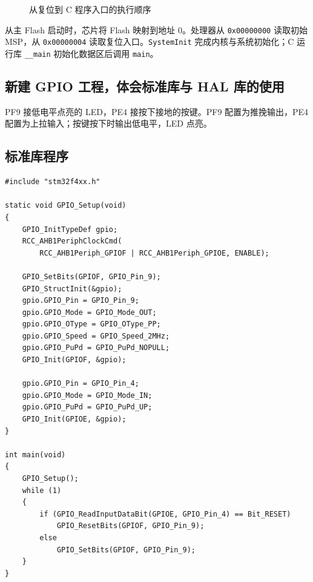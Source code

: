 \documentclass[UTF8,a4paper,zihao=5,fontset=none]{ctexart}
\newcommand{\hex}[1]{\texttt{0x#1}}
\newcommand{\code}[1]{\texttt{#1}}
\begin{document}
\begin{figure}[!ht]
\centering
{}
\caption{从复位到 C 程序入口的执行顺序}
\end{figure}

从主 Flash 启动时，芯片将 Flash 映射到地址 0。处理器从 \hex{00000000} 读取初始 MSP，从 \hex{00000004} 读取复位入口。\code{SystemInit} 完成内核与系统初始化；C 运行库 \code{\_\_main} 初始化数据区后调用 \code{main}。

\clearpage
\subsection{新建 GPIO 工程，体会标准库与 HAL 库的使用}

PF9 接低电平点亮的 LED，PE4 接按下接地的按键。PF9 配置为推挽输出，PE4 配置为上拉输入；按键按下时输出低电平，LED 点亮。

\subsection*{标准库程序}
\begin{lstlisting}
#include "stm32f4xx.h"

static void GPIO_Setup(void)
{
    GPIO_InitTypeDef gpio;
    RCC_AHB1PeriphClockCmd(
        RCC_AHB1Periph_GPIOF | RCC_AHB1Periph_GPIOE, ENABLE);

    GPIO_SetBits(GPIOF, GPIO_Pin_9);
    GPIO_StructInit(&gpio);
    gpio.GPIO_Pin = GPIO_Pin_9;
    gpio.GPIO_Mode = GPIO_Mode_OUT;
    gpio.GPIO_OType = GPIO_OType_PP;
    gpio.GPIO_Speed = GPIO_Speed_2MHz;
    gpio.GPIO_PuPd = GPIO_PuPd_NOPULL;
    GPIO_Init(GPIOF, &gpio);

    gpio.GPIO_Pin = GPIO_Pin_4;
    gpio.GPIO_Mode = GPIO_Mode_IN;
    gpio.GPIO_PuPd = GPIO_PuPd_UP;
    GPIO_Init(GPIOE, &gpio);
}

int main(void)
{
    GPIO_Setup();
    while (1)
    {
        if (GPIO_ReadInputDataBit(GPIOE, GPIO_Pin_4) == Bit_RESET)
            GPIO_ResetBits(GPIOF, GPIO_Pin_9);
        else
            GPIO_SetBits(GPIOF, GPIO_Pin_9);
    }
}
\end{lstlisting}
\end{document}
